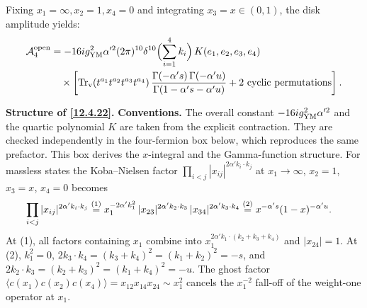 Fixing $x_{1}=\infty, x_{2}=1, x_{4}=0$ and integrating $x_{3} = x \in (0,1)$, the disk amplitude yields:
\begin{align}
	\mathcal{A}_{4}^{\mathrm{open}} &= -16i g_{\mathrm{YM}}^{2}\alpha'^{2}(2\pi)^{10}\delta^{10}\Bigl(\sum_{i=1}^{4}k_{i}\Bigr)\,K(e_{1},e_{2},e_{3},e_{4}) \nonumber \\
	&\quad \times \biggl[\operatorname{Tr}_{\mathrm{v}}(t^{a_{1}}t^{a_{2}}t^{a_{3}}t^{a_{4}})\,\frac{\Gamma(-\alpha's)\,\Gamma(-\alpha'u)}{\Gamma(1-\alpha's-\alpha'u)} + 2\text{ cyclic permutations}\biggr] \:. \label{12.4.22}
\end{align}
\begin{tcolorbox}[breakable]
	\begin{remark}
		\textbf{Structure of \eqref{12.4.22}.} \textbf{Conventions.} The overall constant $-16i g_{\mathrm{YM}}^{2}\alpha'^{2}$ and the quartic polynomial $K$ are taken from the explicit contraction. They are checked independently in the four-fermion box below, which reproduces the same prefactor. This box derives the $x$-integral and the Gamma-function structure. For massless states the Koba--Nielsen factor $\prod_{i<j}|x_{ij}|^{2\alpha'k_{i}\cdot k_{j}}$ at $x_{1}\to\infty$, $x_{2}=1$, $x_{3}=x$, $x_{4}=0$ becomes
		\begin{align*}
			\prod_{i<j}|x_{ij}|^{2\alpha'k_{i}\cdot k_{j}}
			&\overset{(1)}{=} x_{1}^{-2\alpha'k_{1}^{2}}\,|x_{23}|^{2\alpha'k_{2}\cdot k_{3}}\,|x_{34}|^{2\alpha'k_{3}\cdot k_{4}}
			\overset{(2)}{=} x^{-\alpha's}(1-x)^{-\alpha'u} .
		\end{align*}
		At (1), all factors containing $x_{1}$ combine into $x_{1}^{2\alpha'k_{1}\cdot(k_{2}+k_{3}+k_{4})}$ and $|x_{24}|=1$. At (2), $k_{1}^{2}=0$, $2k_{3}\cdot k_{4}=(k_{3}+k_{4})^{2}=(k_{1}+k_{2})^{2}=-s$, and $2k_{2}\cdot k_{3}=(k_{2}+k_{3})^{2}=(k_{1}+k_{4})^{2}=-u$. The ghost factor $\langle c(x_{1})c(x_{2})c(x_{4})\rangle=x_{12}x_{14}x_{24}\sim x_{1}^{2}$ cancels the $x_{1}^{-2}$ fall-off of the weight-one operator at $x_{1}$.


\end{remark}
\end{tcolorbox}
